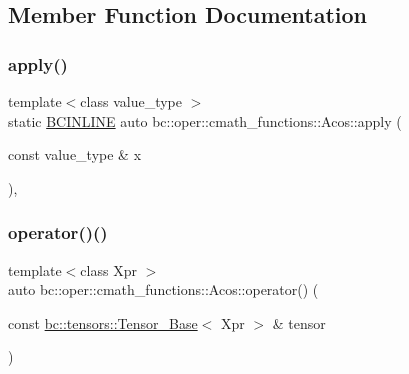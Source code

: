 \subsection{Member Function Documentation}
\mbox{\label{structbc_1_1oper_1_1cmath__functions_1_1Acos_a61ecb6ec260e18bf74d519475debc011}} 
\subsubsection{\texorpdfstring{apply()}{apply()}}
{\footnotesize\ttfamily template$<$class value\+\_\+type $>$ \\
static \hyperlink{common_8h_a6699e8b0449da5c0fafb878e59c1d4b1}{B\+C\+I\+N\+L\+I\+NE} auto bc\+::oper\+::cmath\+\_\+functions\+::\+Acos\+::apply (\begin{DoxyParamCaption}\item[{const value\+\_\+type \&}]{x }\end{DoxyParamCaption})\hspace{0.3cm}{\ttfamily [inline]}, {\ttfamily [static]}}

\mbox{\label{structbc_1_1oper_1_1cmath__functions_1_1Acos_a2bd998572a4c0e610fe19e3da9a4941e}} 
\subsubsection{\texorpdfstring{operator()()}{operator()()}\hspace{0.1cm}{\footnotesize\ttfamily [1/3]}}
{\footnotesize\ttfamily template$<$class Xpr $>$ \\
auto bc\+::oper\+::cmath\+\_\+functions\+::\+Acos\+::operator() (\begin{DoxyParamCaption}\item[{const \hyperlink{classbc_1_1tensors_1_1Tensor__Base}{bc\+::tensors\+::\+Tensor\+\_\+\+Base}$<$ Xpr $>$ \&}]{tensor }\end{DoxyParamCaption})\hspace{0.3cm}{\ttfamily [inline]}}

